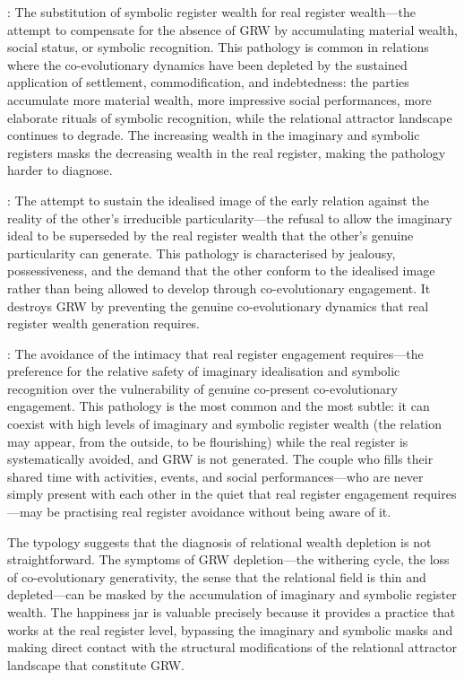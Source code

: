 : The substitution of symbolic register wealth for real register wealth---the attempt to compensate for the absence of GRW by accumulating material wealth, social status, or symbolic recognition. This pathology is common in relations where the co-evolutionary dynamics have been depleted by the sustained application of settlement, commodification, and indebtedness: the parties accumulate more material wealth, more impressive social performances, more elaborate rituals of symbolic recognition, while the relational attractor landscape continues to degrade. The increasing wealth in the imaginary and symbolic registers masks the decreasing wealth in the real register, making the pathology harder to diagnose.

: The attempt to sustain the idealised image of the early relation against the reality of the other's irreducible particularity---the refusal to allow the imaginary ideal to be superseded by the real register wealth that the other's genuine particularity can generate. This pathology is characterised by jealousy, possessiveness, and the demand that the other conform to the idealised image rather than being allowed to develop through co-evolutionary engagement. It destroys GRW by preventing the genuine co-evolutionary dynamics that real register wealth generation requires.

: The avoidance of the intimacy that real register engagement requires---the preference for the relative safety of imaginary idealisation and symbolic recognition over the vulnerability of genuine co-present co-evolutionary engagement. This pathology is the most common and the most subtle: it can coexist with high levels of imaginary and symbolic register wealth (the relation may appear, from the outside, to be flourishing) while the real register is systematically avoided, and GRW is not generated. The couple who fills their shared time with activities, events, and social performances---who are never simply present with each other in the quiet that real register engagement requires---may be practising real register avoidance without being aware of it.

The typology suggests that the diagnosis of relational wealth depletion is not straightforward. The symptoms of GRW depletion---the withering cycle, the loss of co-evolutionary generativity, the sense that the relational field is thin and depleted---can be masked by the accumulation of imaginary and symbolic register wealth. The happiness jar is valuable precisely because it provides a practice that works at the real register level, bypassing the imaginary and symbolic masks and making direct contact with the structural modifications of the relational attractor landscape that constitute GRW.
